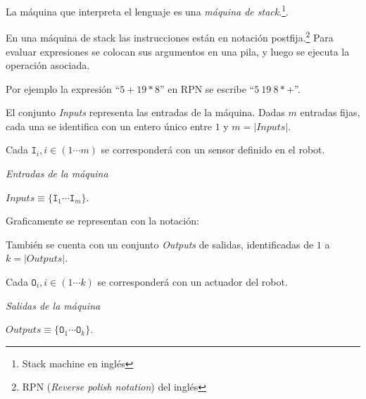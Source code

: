 
  La máquina que interpreta el lenguaje \alf{} es una
\textit{máquina de stack}.\footnote{Stack machine en inglés}.

  En una máquina de stack las instrucciones están en notación
postfija.\footnote{RPN (\textit{Reverse polish notation}) del inglés}
  Para evaluar expresiones se colocan sus argumentos en una pila, y luego
se ejecuta la operación asociada.
  
  Por ejemplo la expresión ``$5 + 19 * 8$'' en RPN se
escribe ``$5\ 19\ 8 * +$''.

%
%

  El conjunto \textit{Inputs} representa las entradas de la máquina.
  Dadas $m$ entradas fijas, cada una se identifica con un entero único
  entre $1$ y $m = | \textit{Inputs} |$.

  Cada $\texttt{I}_i, i \in (1 \dotsb m)$ se corresponderá con un sensor
  definido en el robot.

\begin{definicion}
  \textit{Entradas de la máquina}\\
  \begin{center}
    $\textit{Inputs} \equiv \{\texttt{I}_1 \dotsb \texttt{I}_m\}$.
  \end{center}
\end{definicion}
  
  Graficamente se representan con la notación:

  

  También se cuenta con un conjunto \textit{Outputs} de salidas,
  identificadas de $1$ a $k = | \textit{Outputs} |$.
  
  Cada $\texttt{O}_i, i \in (1 \dotsb k)$ se corresponderá con un actuador
  del robot.

\begin{definicion}
  \textit{Salidas de la máquina}\\
  \begin{center}
    $\textit{Outputs} \equiv \{\texttt{O}_1 \dotsb \texttt{O}_k\}$.
  \end{center}
\end{definicion}
  
